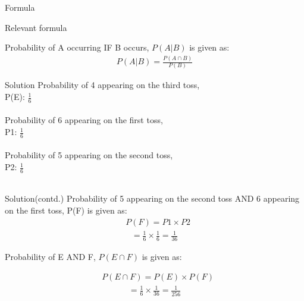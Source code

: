 \documentclass{beamer}
\begin{document}
\begin{frame}{Formula}
    \begin{block}{Relevant formula}
        \item Probability of A occurring IF B occurs, $P(A|B)$ is given as:
            \begin{align*}
                P(A \vert B) = \frac{P(A \cap B)}{P(B)}
            \end{align*}
    \end{block}
\end{frame}
\begin{frame}{Solution}
    Probability of 4 appearing on the third toss, \\
    P(E): \(\frac{1}{6}\)\\
    \\
    Probability of 6 appearing on the first toss, \\
    P1: \(\frac{1}{6}\)\\
    \\
    Probability of 5 appearing on the second toss,\\
    P2: \(\frac{1}{6}\)\\
    \\
\end{frame}
\begin{frame}{Solution(contd.)}
    Probability of 5 appearing on the second toss AND 6 appearing on the first toss, P(F) is given as:\\
\begin{align}
  &P(F)=P1\times P2
\end{align}
\begin{align}
   = \frac{1}{6} \times \frac{1}{6}
   = \frac{1}{36}
\end{align}

  Probability of E AND F, $P(E \cap F)$ is given as:

\begin{align}
  &P(E \cap F)=P(E)\times P(F)
\end{align}
\begin{align}
   = \frac{1}{6} \times \frac{1}{36}
   = \frac{1}{256}
\end{align}
\end{frame}
\end{document}
